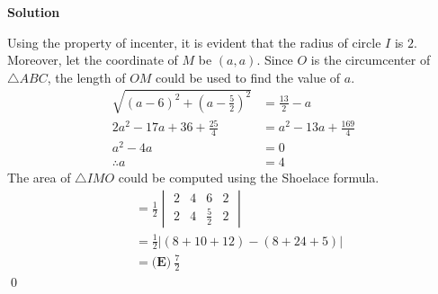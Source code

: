 \documentclass{article}
\newenvironment{solution}{\begin{trivlist}\item[]{\bf Solution}}{\qed \end{trivlist}}
\begin{document}
\begin{solution}
\begin{minipage}{0.5\textwidth}
\begin{center}
\end{center}
\end{minipage}

Using the property of incenter, it is evident that the radius of circle $I$ is $2$. Moreover, let the coordinate of $M$ be $(a, a)$. Since $O$ is the circumcenter of $\triangle{ABC}$, the length of $OM$ could be used to find the value of $a$.
\begin{align*}
    \sqrt{(a - 6)^2 + \left( a - \frac{5}{2} \right)^2} &= \frac{13}{2} - a \\
    2a^2 - 17a + 36 + \frac{25}{4} &= a^2 - 13a + \frac{169}{4} \\
    a^2 - 4a &= 0 \\
    \therefore a &= 4
\end{align*}
The area of $\triangle{IMO}$ could be computed using the Shoelace formula.
\begin{align*}
    [IMO]
    &= \frac{1}{2}
    \begin{vmatrix}
        2 & 4 & 6 & 2 \\
        2 & 4 & \frac{5}{2} & 2
    \end{vmatrix} \\
    &= \frac{1}{2} \left| (8 + 10 + 12) - (8 + 24 + 5) \right| \\
    &= \boxed{\textbf{(E)}\ \frac72}
\end{align*}
\end{solution}
\end{document}
